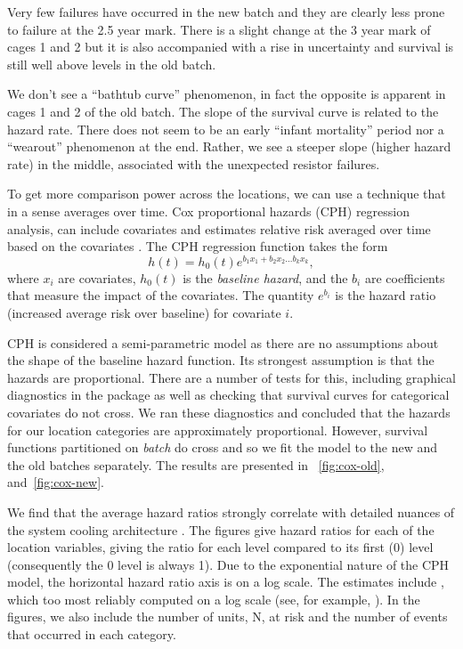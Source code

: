 Very few failures have occurred in the new batch and they are clearly
less prone to failure at the 2.5 year mark. There is a slight change
at the 3 year mark of cages 1 and 2 but it is also accompanied with a
rise in uncertainty and survival is still well above levels in the old
batch.

We don't see a ``bathtub curve'' phenomenon, in fact the opposite is
apparent in cages 1 and 2 of the old batch. The slope of the survival
curve is related to the hazard rate. There does not seem to be an
early ``infant mortality'' period nor a ``wearout'' phenomenon at the
end. Rather, we see a steeper slope (higher hazard rate) in the
middle, associated with the unexpected resistor failures.

To get more comparison power across the locations, we can use a
technique that in a sense averages over time. Cox proportional hazards
(CPH) regression analysis, can include covariates and estimates
relative risk averaged over time based on the covariates
. The CPH regression function takes
the form
\begin{displaymath}
  h(t) = h_0(t)e^{b_1 x_1 + b_2 x_2 \ldots b_k x_k},
\end{displaymath}
where $x_i$ are covariates, $h_0(t)$ is the {\em baseline hazard}, and
the $b_i$ are coefficients that measure the impact of the
covariates. The quantity $e^{b_i}$ is the hazard ratio (increased
average risk over baseline) for covariate $i$.

CPH is considered a semi-parametric model as there are no assumptions
about the shape of the baseline hazard function. Its strongest
assumption is that the hazards are proportional. There are a number of
tests for this, including graphical diagnostics in the 
package as well as checking that survival curves for categorical
covariates do not cross. We ran these diagnostics and concluded that
the hazards for our location categories are approximately
proportional. However, survival functions partitioned on {\em batch}
do cross and so we fit the model to the new and the old batches
separately. The results are presented in ~\ref{fig:cox-old},
and~\ref{fig:cox-new}.

We find that the average hazard ratios strongly correlate with
detailed nuances of the system cooling architecture .  The figures give
hazard ratios for each of the location variables, giving the ratio for
each level compared to its first (0) level (consequently the 0 level
is always 1). Due to the exponential nature of the CPH model, the
horizontal hazard ratio axis is on a log scale. The estimates include
, which too  most reliably
computed on a log scale (see, for example, \cite{Ostrouchov88}). In
the figures, we also include the number of units, N, at risk and the
number of events that occurred in each category.

